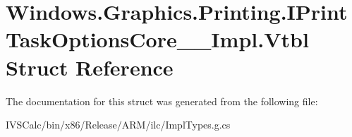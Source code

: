 \hypertarget{struct_windows_1_1_graphics_1_1_printing_1_1_i_print_task_options_core_____impl_1_1_vtbl}{}\section{Windows.\+Graphics.\+Printing.\+I\+Print\+Task\+Options\+Core\+\_\+\+\_\+\+Impl.\+Vtbl Struct Reference}
\label{struct_windows_1_1_graphics_1_1_printing_1_1_i_print_task_options_core_____impl_1_1_vtbl}


The documentation for this struct was generated from the following file\+:\begin{DoxyCompactItemize}
\item 
I\+V\+S\+Calc/bin/x86/\+Release/\+A\+R\+M/ilc/Impl\+Types.\+g.\+cs\end{DoxyCompactItemize}
